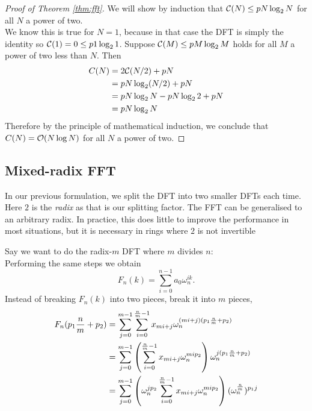 \begin{proof}[Proof of Theorem \ref{thm:fft}]
    We will show by induction that $\mathcal C(N) \le pN\log_2 N$ for all $N$ a power of two.\\
    We know this is true for $N = 1$, because in that case the DFT is simply the identity so $\mathcal C(1) = 0 \le p1 \log_2 1$.
    Suppose $\mathcal C(M) \le pM\log_2 M$ holds for all $M$ a power of two less than $N$. Then
    \begin{align*}
        C(N)
        &= 2\mathcal C(N/2) + pN\\
        &= pN\log_2 (N/2) + pN\\
        &= pN\log_2 N - pN\log_2 2 + pN\\
        &= pN\log_2 N
    \end{align*}
    Therefore by the principle of mathematical induction, we conclude that $C(N) = \mathcal O(N \log N)$ for all $N$ a power of two.
\end{proof}


\subsection{Mixed-radix FFT}

In our previous formulation, we split the DFT into two smaller DFTs each time. Here $2$ is the \emph{radix} as that is our splitting factor. The FFT can be generalised to an arbitrary radix. In practice, this does little to improve the performance in most situations, but it is necessary in rings where $2$ is not invertible

Say we want to do the radix-$m$ DFT where $m$ divides $n$:\\
Performing the same steps we obtain
\[
    F_n(k) = \sum^{n-1}_{i=0} a_0\omega_n^{ik}.
\]
Instead of breaking $F_n(k)$ into two pieces, break it into $m$ pieces,
\begin{align*}
    F_n(p_1\frac{n}{m} + p_2) &= \sum^{m-1}_{j=0} \sum^{\frac{n}{m}-1}_{i=0} x_{mi + j}\omega_n^{(mi + j)(p_1 \frac{n}{m} + p_2)}\\ 
                              &= \sum^{m-1}_{j=0} \left(\sum^{\frac{n}{m}-1}_{i=0} x_{mi + j}\omega_n^{mi p_2}\right) \omega_n^{j(p_1\frac{n}{m} + p_2)}\\
                              &= \sum^{m-1}_{j=0} \left(\omega_n^{jp_2}\sum^{\frac{n}{m}-1}_{i=0} x_{mi + j}\omega_n^{mi p_2}\right) (\omega_n^{\frac{n}{m}})^{p_1 j}
\end{align*}


